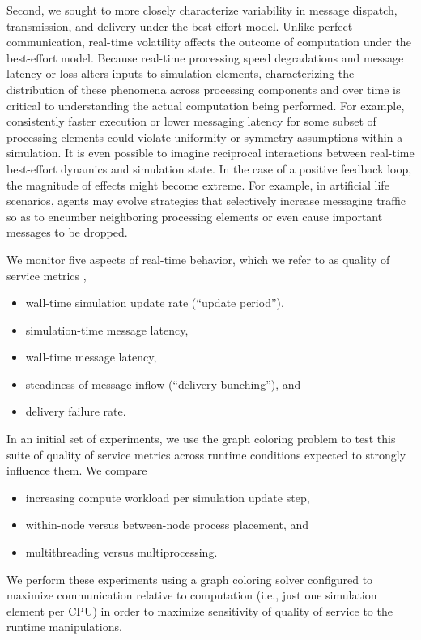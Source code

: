 Second, we sought to more closely characterize variability in message dispatch, transmission, and delivery under the best-effort model.
Unlike perfect communication, real-time volatility affects the outcome of computation under the best-effort model.
Because real-time processing speed degradations and message latency or loss alters inputs to simulation elements, characterizing the distribution of these phenomena across processing components and over time is critical to understanding the actual computation being performed.
For example, consistently faster execution or lower messaging latency for some subset of processing elements could violate uniformity or symmetry assumptions within a simulation.
It is even possible to imagine reciprocal interactions between real-time best-effort dynamics and simulation state.
In the case of a positive feedback loop, the magnitude of effects might become extreme.
For example, in artificial life scenarios, agents may evolve strategies that selectively increase messaging traffic so as to encumber neighboring processing elements or even cause important messages to be dropped.

We monitor five aspects of real-time behavior, which we refer to as quality of service metrics \citep{karakus2017quality},
\begin{itemize}
  \item wall-time simulation update rate (``update period''),
  \item simulation-time message latency,
  \item wall-time message latency,
  \item steadiness of message inflow (``delivery bunching''), and
  \item delivery failure rate.
\end{itemize}

In an initial set of experiments, we use the graph coloring problem to test this suite of quality of service metrics across runtime conditions expected to strongly influence them.
We compare
\begin{itemize}
  \item increasing compute workload per simulation update step,
  \item within-node versus between-node process placement, and
  \item multithreading versus multiprocessing.
\end{itemize}
We perform these experiments using a graph coloring solver configured to maximize communication relative to computation (i.e., just one simulation element per CPU) in order to maximize sensitivity of quality of service to the runtime manipulations.


